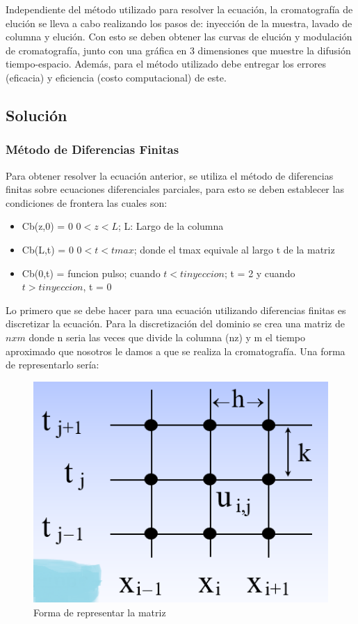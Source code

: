 \par Independiente del método utilizado para resolver la ecuación, la cromatografía de elución se lleva a cabo realizando los pasos de: inyección de la muestra, lavado de columna y
elución. Con esto se deben obtener las curvas de elución y modulación de cromatografía, junto con una gráfica en 3 dimensiones que muestre la difusión tiempo-espacio. Además, para el método utilizado debe entregar los errores (eficacia) y eficiencia (costo computacional) de este.

\subsection{Solución}

\subsubsection{Método de Diferencias Finitas}

\par  Para obtener resolver la ecuación anterior, se utiliza el método de diferencias finitas sobre ecuaciones diferenciales parciales, para esto se deben establecer las condiciones de frontera las cuales son:

\begin{itemize}
	\item Cb(z,0) = 0   $0 < z < L$;  L: Largo de la columna
	\item Cb(L,t) = 0  $0< t < tmax$; donde el tmax equivale al largo t de la matriz
	\item Cb(0,t) = funcion pulso; cuando $t < tinyeccion$; t = 2 y cuando $t > tinyeccion$, t = 0
\end{itemize}

Lo primero que se debe hacer para una ecuación utilizando diferencias finitas es discretizar la ecuación. Para la discretización del dominio se crea una matriz de $n x m$ donde n seria las veces que divide la columna (nz) y m el tiempo aproximado que nosotros le damos a que se realiza la cromatografía. Una forma de representarlo sería:

\begin{figure}[!ht]
	\centering
	\includegraphics[scale=0.6]{Imagenes/matriz.png}
	\caption{Forma de representar la matriz}
	\label{fig:ej}
\end{figure}

